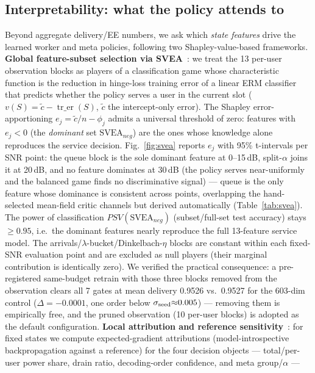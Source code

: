 \documentclass[journal]{IEEEtran}
\begin{document}
\subsection{Interpretability: what the policy attends to}
\label{sec:interp}

Beyond aggregate delivery/EE numbers, we ask which \emph{state features} drive the
learned worker and meta policies, following two Shapley-value-based frameworks.
\textbf{Global feature-subset selection via SVEA}~\cite{tripathi2020svea}: we treat
the 13 per-user observation blocks as players of a classification game whose
characteristic function is the reduction in hinge-loss training error of a linear
ERM classifier that predicts whether the policy serves a user in the current slot
($v(S) = \tilde{c} - \operatorname{tr\_er}(S)$, $\tilde{c}$ the intercept-only error).
The Shapley error-apportioning $e_j = \tilde{c}/n - \phi_j$ admits a universal
threshold of zero: features with $e_j < 0$ (the \emph{dominant} set
$\mathrm{SVEA}_{neg}$) are the ones whose knowledge alone reproduces the service
decision. Fig.~\ref{fig:svea} reports $e_j$ with 95\% t-intervals per SNR point: the
queue block is the sole dominant feature at 0--15\,dB, split-$\alpha$ joins it at
20\,dB, and no feature dominates at 30\,dB (the policy serves near-uniformly and
the balanced game finds no discriminative signal) --- queue is the only feature
whose dominance is consistent across points, overlapping the hand-selected
mean-field critic channels but derived automatically (Table~\ref{tab:svea}).
The power of classification $PSV(\mathrm{SVEA}_{neg})$ (subset/full-set test
accuracy) stays $\geq 0.95$, i.e.\ the dominant features nearly reproduce the full
13-feature service model. The arrivals/$\lambda$-bucket/Dinkelbach-$\eta$ blocks
are constant within each fixed-SNR evaluation point and are excluded as null
players (their marginal contribution is identically zero). We verified the
practical consequence: a pre-registered same-budget retrain with those three
blocks removed from the observation clears all 7 gates at mean delivery 0.9526
vs.\ 0.9527 for the 603-dim control ($\Delta{=}-0.0001$, one order below
$\sigma_{\rm seed}{\approx}0.005$) --- removing them is empirically free, and
the pruned observation (10 per-user blocks) is adopted as the default
configuration.
\textbf{Local attribution and reference sensitivity}~\cite{fernando2019deepshap}:
for fixed states we compute expected-gradient attributions (model-introspective
backpropagation against a reference) for the four decision objects --- total/per-user
power share, drain ratio, decoding-order confidence, and meta group/$\alpha$ ---
\end{document}
